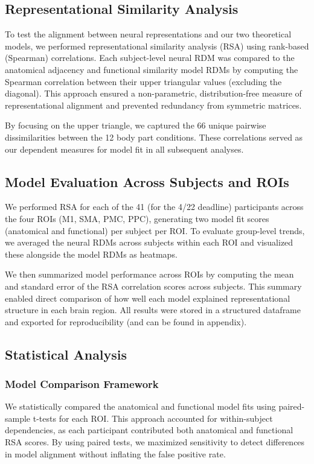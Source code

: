 \documentclass{article}
\begin{document}
\subsection{Representational Similarity Analysis}
To test the alignment between neural representations and our two theoretical models, we performed representational similarity analysis (RSA) using rank-based (Spearman) correlations. Each subject-level neural RDM was compared to the anatomical adjacency and functional similarity model RDMs by computing the Spearman correlation between their upper triangular values (excluding the diagonal). This approach ensured a non-parametric, distribution-free measure of representational alignment and prevented redundancy from symmetric matrices.

By focusing on the upper triangle, we captured the 66 unique pairwise dissimilarities between the 12 body part conditions. These correlations served as our dependent measures for model fit in all subsequent analyses.

\subsection{Model Evaluation Across Subjects and ROIs}
We performed RSA for each of the 41 (for the 4/22 deadline) participants across the four ROIs (M1, SMA, PMC, PPC), generating two model fit scores (anatomical and functional) per subject per ROI. To evaluate group-level trends, we averaged the neural RDMs across subjects within each ROI and visualized these alongside the model RDMs as heatmaps.

We then summarized model performance across ROIs by computing the mean and standard error of the RSA correlation scores across subjects. This summary enabled direct comparison of how well each model explained representational structure in each brain region. All results were stored in a structured dataframe and exported for reproducibility (and can be found in appendix).

\subsection{Statistical Analysis}
\subsubsection{Model Comparison Framework}
We statistically compared the anatomical and functional model fits using paired-sample t-tests for each ROI. This approach accounted for within-subject dependencies, as each participant contributed both anatomical and functional RSA scores. By using paired tests, we maximized sensitivity to detect differences in model alignment without inflating the false positive rate.
\end{document}
